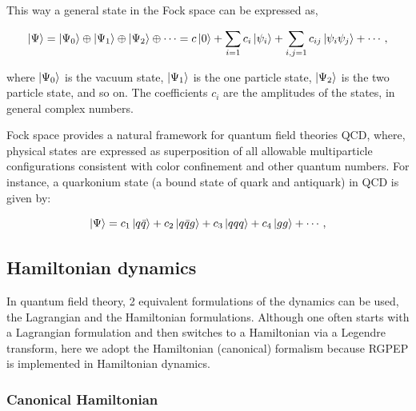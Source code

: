 \documentclass[11pt,a4paper,twoside,pdf]{article}
\numberwithin{equation}{section}
\begin{document}
This way a general state in the Fock space can be expressed as,

\begin{equation}
    \ket{\Psi} = \ket{\Psi_0} \oplus \ket{\Psi_1} \oplus
    \ket{\Psi_2} \oplus \cdots = c \ket{0} + \sum_{i=1}c_i \ket{\psi_i} +
    \sum_{i,j=1}c_{ij} \ket{\psi_i \psi_j} + \cdots,
\end{equation}

where $\ket{\Psi_0}$ is the vacuum state, $\ket{\Psi_1}$ is the one particle
state, $\ket{\Psi_2}$ is the two particle state, and so on. The coefficients $c_i$
are the amplitudes of the states, in general complex numbers. 

Fock space provides a natural framework for quantum field theories QCD, where, 
physical states are expressed as superposition of all allowable multiparticle 
configurations consistent with color confinement and other quantum numbers. 
For instance, a quarkonium state (a bound state of quark and antiquark) in QCD is 
given by:

\begin{equation}
    \ket{\Psi} = c_1 \ket{q\bar{q}} + c_2 \ket{q\bar{q}g} + c_3 \ket{qqq} 
    + c_4 \ket{gg} + \cdots,
\end{equation}

\subsection{Hamiltonian dynamics}

In quantum field theory, 2 equivalent formulations of the dynamics can be used, 
the Lagrangian and the Hamiltonian formulations. Although one often starts with a 
Lagrangian formulation and then switches to a Hamiltonian via a Legendre transform, 
here we adopt the Hamiltonian (canonical) formalism because RGPEP is implemented 
in Hamiltonian dynamics.

\subsubsection{Canonical Hamiltonian}\label{sec:canonical_hamiltonian}
\end{document}
